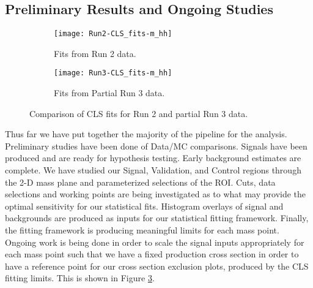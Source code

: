 \documentclass[12pt]{article}
\begin{document}
\subsection{Preliminary Results and Ongoing Studies}
\begin{figure}[t]
    \centering
    \begin{subfigure}[t]{.48\textwidth}
        \centering
        \texttt{[image: Run2-CLS\_fits-m\_hh]}
        \caption{Fits from Run 2 data.}
        \label{subfig:cls-run2}
    \end{subfigure}
    \begin{subfigure}[t]{.48\textwidth}
        \centering
        \texttt{[image: Run3-CLS\_fits-m\_hh]}
        \caption{Fits from Partial Run 3 data.}
        \label{subfig:cls-run3}
    \end{subfigure}
\caption{Comparison of CLS fits for Run 2 and partial Run 3 data.}
\label{fig:cls_fit_results}
\end{figure}
Thus far we have put together the majority of the pipeline for the analysis.
Preliminary studies have been done of Data/MC comparisons. Signals have been
produced and are ready for hypothesis testing. Early background estimates are
complete. We have studied our Signal, Validation, and Control regions through
the 2-D mass plane and parameterized selections of the ROI. Cuts, data
selections and working points are being investigated as to what may provide the
optimal sensitivity for our statistical fits. Histogram overlays of signal and
backgrounds are produced as inputs for our statistical fitting framework.
Finally, the fitting framework is producing meaningful limits for each mass
point. Ongoing work is being done in order to scale the signal inputs
appropriately for each mass point such that we have a fixed production cross
section in order to have a reference point for our cross section exclusion
plots, produced by the CLS fitting limits. This is shown in Figure
\ref{fig:cls_fit_results}. 
\end{document}

